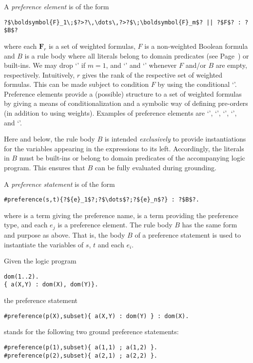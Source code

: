 A \emph{preference element} is of the form
\begin{lstlisting}[numbers=none,escapechar=?]
?$\boldsymbol{F}_1\;$?>?\,\dots\,?>?$\;\boldsymbol{F}_m$? || ?$F$? : ?$B$?
\end{lstlisting}
where each $\boldsymbol{F}_r$ is a set of weighted formulas, 
$F$ is a non-weighted Boolean formula
and $B$ is a rule body where all literals belong to domain predicates
(see Page~\pageref{pg:domain}) or built-ins.
%
We may drop `\code{>}' if $m=1$, 
and `' and `' whenever $F$ and/or $B$ are empty, respectively.
%
Intuitively, $r$ gives the rank of the respective set of weighted formulas.
This can be made subject to condition $F$ by using the conditional `\code{||}'.
Preference elements provide a (possible) structure to a set of weighted formulas
by giving a means of conditionalization and a symbolic way of defining pre-orders (in addition to using weights).
%
%
Examples of preference elements are 
`', 
`',  
`', 
`',  and
`'.

\begin{note}
Here and below, 
the rule body $B$ is intended \emph{exclusively} to provide instantiations for the variables appearing in the expressions to its left.  
Accordingly, the literals in $B$ must be built-ins or belong to domain predicates of the accompanying logic program.
This ensures that $B$ can be fully evaluated during grounding.
\end{note}

A \emph{preference statement} is of the form
%
\begin{lstlisting}[numbers=none,escapechar=?]
#preference(s,t){?${e}_1$?;?$\dots$?;?${e}_n$?} : ?$B$?.
\end{lstlisting}
%
where  is a term giving the preference name, 
 is a  term providing the preference type, 
and each $e_j$ is a preference element.
The rule body $B$ has the same form and purpose as above.
%
That is, the body $B$ of a preference statement is used to instantiate the variables of $s$, $t$ and each $e_i$.

\begin{example}
\label{asprin:example2}
Given the logic program 
\begin{lstlisting}[numbers=none]
dom(1..2).
{ a(X,Y) : dom(X), dom(Y)}.
\end{lstlisting}
the preference statement 
\begin{lstlisting}[numbers=none]
#preference(p(X),subset){ a(X,Y) : dom(Y) } : dom(X).
\end{lstlisting}
stands for the following two ground preference statements:
\begin{lstlisting}[numbers=none]
#preference(p(1),subset){ a(1,1) ; a(1,2) }.
#preference(p(2),subset){ a(2,1) ; a(2,2) }.
\end{lstlisting}
\end{example}

